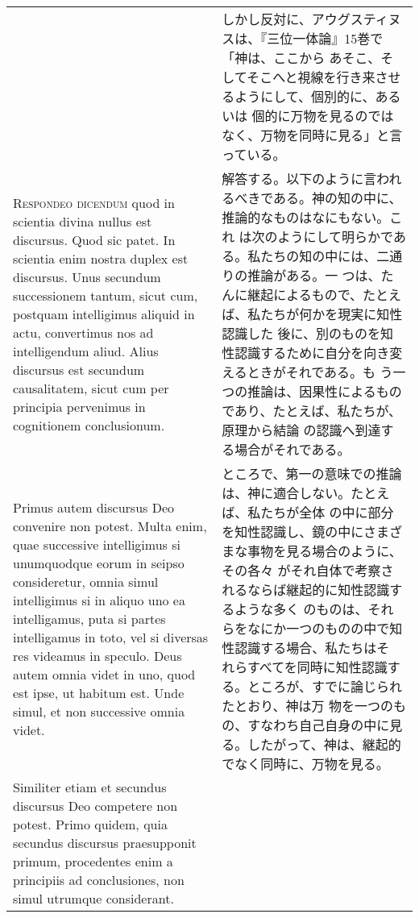 \documentclass[10pt]{jsarticle} %
\begin{document}
\begin{longtable}{p{21em}p{21em}}
&

しかし反対に、アウグスティヌスは、『三位一体論』15巻で「神は、ここから
あそこ、そしてそこへと視線を行き来させるようにして、個別的に、あるいは
個的に万物を見るのではなく、万物を同時に見る」と言っている。

\\


{\scshape Respondeo dicendum} quod in scientia divina nullus est
discursus. Quod sic patet. In scientia enim nostra duplex est
discursus. Unus secundum successionem tantum, sicut cum, postquam
intelligimus aliquid in actu, convertimus nos ad intelligendum aliud.
Alius discursus est secundum causalitatem, sicut cum per principia
pervenimus in cognitionem conclusionum.

&


解答する。以下のように言われるべきである。神の知の中に、推論的なものはなにもない。これ
は次のようにして明らかである。私たちの知の中には、二通りの推論がある。一
つは、たんに継起によるもので、たとえば、私たちが何かを現実に知性認識した
後に、別のものを知性認識するために自分を向き変えるときがそれである。も
う一つの推論は、因果性によるものであり、たとえば、私たちが、原理から結論
の認識へ到達する場合がそれである。

\\

Primus autem discursus
Deo convenire non potest. Multa enim, quae successive intelligimus si
unumquodque eorum in seipso consideretur, omnia simul intelligimus si in
aliquo uno ea intelligamus, puta si partes intelligamus in toto, vel si
diversas res videamus in speculo. Deus autem omnia videt in uno, quod
est ipse, ut habitum est. 
Unde simul, et non successive omnia
videt.

&

ところで、第一の意味での推論は、神に適合しない。たとえば、私たちが全体
の中に部分を知性認識し、鏡の中にさまざまな事物を見る場合のように、その各々
がそれ自体で考察されるならば継起的に知性認識するような多く
のものは、それらをなにか一つのものの中で知性認識する場合、私たちはそ
れらすべてを同時に知性認識する。ところが、すでに論じられたとおり、神は万
物を一つのもの、すなわち自己自身の中に見る。したがって、神は、継起的でなく同時に、万物を見る。


\\

Similiter etiam et secundus discursus Deo competere non
potest. Primo quidem, quia secundus discursus praesupponit primum,
procedentes enim a principiis ad conclusiones, non simul utrumque
considerant. 


\end{longtable}
\end{document}
